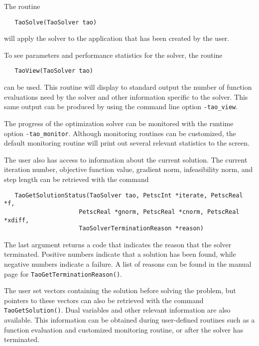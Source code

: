 The routine
\begin{verbatim}
   TaoSolve(TaoSolver tao)
\end{verbatim}
\noindent
will apply the solver to the application that has been created by the user.

To see parameters and performance statistics for the solver, the
routine
\begin{verbatim}
   TaoView(TaoSolver tao)
\end{verbatim}
can be used.  This routine will display to standard output the number
of function evaluations need by the solver and other information
specific to the solver.  This same output can be produced by using the 
command line option {\tt -tao\_view}.

The progress of the optimization solver can be monitored with
the runtime option {\tt -tao\_monitor}.  Although monitoring routines
can be customized, the default monitoring routine will print out 
several relevant statistics to the screen.

The user also has access to information about the current solution.
The current iteration number, objective function value, gradient
norm, infeasibility norm, and step length 
can be retrieved with the command 
\begin{verbatim}
   TaoGetSolutionStatus(TaoSolver tao, PetscInt *iterate, PetscReal *f,
                     PetscReal *gnorm, PetscReal *cnorm, PetscReal *xdiff,
                     TaoSolverTerminationReason *reason)
\end{verbatim}
\noindent
The last argument returns a code that indicates the reason that the solver 
terminated.  Positive 
numbers indicate that a solution has been found, while negative numbers
indicate a failure.  A list of reasons can be found in the manual page
for {\tt Tao\-Get\-Termination\-Reason()}.

The user set
vectors containing the solution before solving
the problem, but pointers to these vectors can also be retrieved with the
command {\tt TaoGetSolution()}.
Dual variables and other relevant information are also available. 
This information can be obtained during
user-defined routines such as a function evaluation and customized
monitoring routine, or after the solver has terminated.

